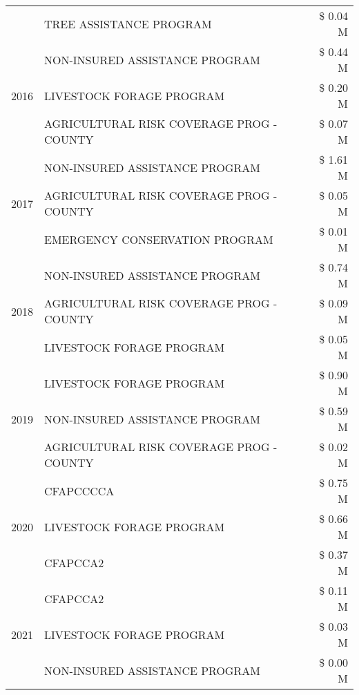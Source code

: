 \begin{tabular}{llr}
 & TREE ASSISTANCE PROGRAM & \$ 0.04 M \\
\cline{1-3}
\multirow[t]{3}{*}{2016} & NON-INSURED ASSISTANCE PROGRAM & \$ 0.44 M \\
 & LIVESTOCK FORAGE PROGRAM & \$ 0.20 M \\
 & AGRICULTURAL RISK COVERAGE PROG - COUNTY & \$ 0.07 M \\
\cline{1-3}
\multirow[t]{3}{*}{2017} & NON-INSURED ASSISTANCE PROGRAM & \$ 1.61 M \\
 & AGRICULTURAL RISK COVERAGE PROG - COUNTY & \$ 0.05 M \\
 & EMERGENCY CONSERVATION PROGRAM & \$ 0.01 M \\
\cline{1-3}
\multirow[t]{3}{*}{2018} & NON-INSURED ASSISTANCE PROGRAM & \$ 0.74 M \\
 & AGRICULTURAL RISK COVERAGE PROG - COUNTY & \$ 0.09 M \\
 & LIVESTOCK FORAGE PROGRAM & \$ 0.05 M \\
\cline{1-3}
\multirow[t]{3}{*}{2019} & LIVESTOCK FORAGE PROGRAM & \$ 0.90 M \\
 & NON-INSURED ASSISTANCE PROGRAM & \$ 0.59 M \\
 & AGRICULTURAL RISK COVERAGE PROG - COUNTY & \$ 0.02 M \\
\cline{1-3}
\multirow[t]{3}{*}{2020} & CFAPCCCCA & \$ 0.75 M \\
 & LIVESTOCK FORAGE PROGRAM & \$ 0.66 M \\
 & CFAPCCA2 & \$ 0.37 M \\
\cline{1-3}
\multirow[t]{3}{*}{2021} & CFAPCCA2 & \$ 0.11 M \\
 & LIVESTOCK FORAGE PROGRAM & \$ 0.03 M \\
 & NON-INSURED ASSISTANCE PROGRAM & \$ 0.00 M \\
\cline{1-3}
\bottomrule
\end{tabular}
